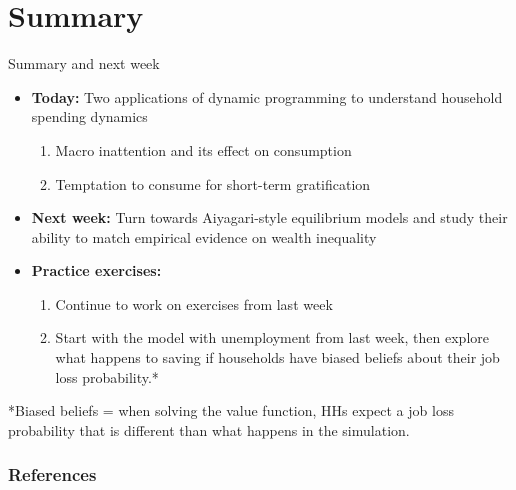 \documentclass[10pt,english,t,10pt]{beamer}
\begin{document}
\section{Summary}
\begin{frame}{Summary and next week}
\begin{itemize}
	\item <+->\textbf{Today: }Two applications of dynamic programming to
	understand household spending dynamics
	\begin{enumerate}
		\item Macro inattention and its effect on consumption
		\item Temptation to consume for short-term gratification\vfill
	\end{enumerate}
	\item <+->\textbf{Next week: } Turn towards Aiyagari-style equilibrium models and study their ability to match empirical evidence on wealth inequality
	\item <+->\textbf{Practice exercises:}
	\begin{enumerate}
		\item Continue to work on exercises from last week
		\item Start with the model with unemployment from last week, then explore what happens to saving if households have biased beliefs about their job loss probability.*
	\end{enumerate}
\end{itemize}
\pause
*Biased beliefs = when solving the value function, HHs expect a job loss probability that is different than what happens in the simulation.
\end{frame}
%


\tiny

\beamerdefaultoverlayspecification{<*>}

\begin{frame}[t,allowframebreaks]
\frametitle{References}

%



\end{frame}

\normalsize
\end{document}
